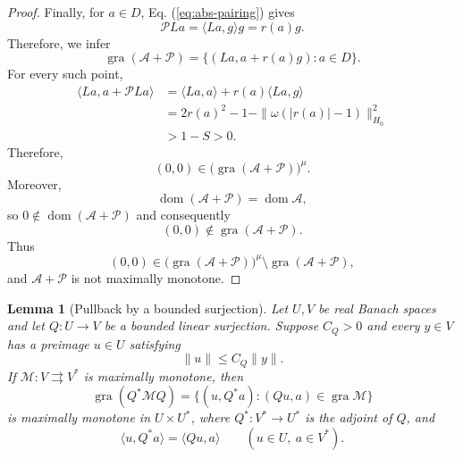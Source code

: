\documentclass[11pt]{article}
\newcommand{\gra}{\operatorname{gra}}
\newcommand{\dom}{\operatorname{dom}}
\newcommand{\pair}[2]{\langle #1,#2\rangle}
\newtheorem{lemma}{Lemma}
\theoremstyle{definition}
\theoremstyle{remark}
\begin{document}
\begin{proof}
Finally, for $a\in D$, Eq. (\ref{eq:abs-pairing}) gives
\[
\mathcal PLa
=
\pair{La}{g}g
=
r(a)g.
\]
Therefore, we infer 
\[
\gra(\mathcal A+\mathcal P)
=
\{(La,a+r(a)g):a\in D\}.
\]
For every such point,
\[
\begin{aligned}
\pair{La}{a+\mathcal PLa}
&=\pair{La}{a}+r(a)\pair{La}{g}\\
&=2r(a)^2-1-\|\omega(|r(a)|-1)\|_{H_0}^2\\
&>1-S>0.
\end{aligned}
\]
Therefore,
\[
(0,0)\in
\bigl(\gra(\mathcal A+\mathcal P)\bigr)^\mu.
\]
Moreover,
\[
\dom(\mathcal A+\mathcal P)
=
\dom\mathcal A,
\]
so $0\notin\dom(\mathcal A+\mathcal P)$ and consequently
\[
(0,0)\notin\gra(\mathcal A+\mathcal P).
\]
Thus
\[
(0,0)\in
\bigl(\gra(\mathcal A+\mathcal P)\bigr)^\mu
\setminus
\gra(\mathcal A+\mathcal P),
\]
and $\mathcal A+\mathcal P$ is not maximally monotone.
\end{proof}

\begin{lemma}[Pullback by a bounded surjection]
\label{lem:surjection-transport}
Let $U,V$ be real Banach spaces and let $Q:U\to V$ be a bounded linear surjection. Suppose $C_Q>0$ and every $y\in V$ has a preimage $u\in U$ satisfying
\[
\|u\|\le C_Q\|y\|.
\]
If $\mathcal M:V\rightrightarrows V^*$ is maximally monotone, then
\[
\gra(Q^*\mathcal M Q)
=
\{(u,Q^*a):(Qu,a)\in\gra\mathcal M\}
\]
is maximally monotone in $U\times U^*$, where $Q^*:V^*\to U^*$ is the adjoint of $Q$, and
\[
\pair{u}{Q^*a}=\pair{Qu}{a}
\qquad(u\in U,\ a\in V^*).
\]
\end{lemma}
\end{document}
